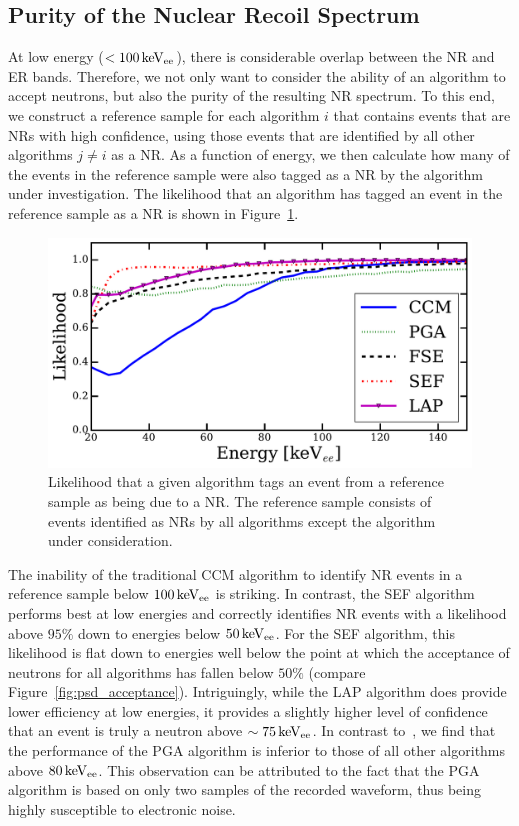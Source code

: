 \subsection{Purity of the Nuclear Recoil Spectrum}

At low energy ($<100\,\mathrm{keV_{ee}}$), there is considerable overlap between the NR and ER bands. Therefore, we not only want to consider the ability of an algorithm to accept neutrons, but also the purity of the resulting NR spectrum. To this end, we construct a reference sample for each algorithm $i$ that contains events that are NRs with high confidence, using those events that are identified by all other algorithms $j\neq i$ as a NR. As a function of energy, we then calculate how many of the events in the reference sample were also tagged as a NR by the algorithm under investigation. The likelihood that an algorithm has tagged an event in the reference sample as a NR is shown in Figure~\ref{fig:n-1_comparison}.

\begin{figure}[htb]
\centering
    \includegraphics[width = \textwidth]{figures/psd/fig_likelihood}
    \caption{Likelihood that a given algorithm tags an event from a reference sample as being due to a NR. The reference sample consists of events identified as NRs by all algorithms except the algorithm under consideration.}\label{fig:n-1_comparison}
\end{figure}

The inability of the traditional CCM algorithm to identify NR events in a reference sample below $100\,\mathrm{keV_{ee}}$ is striking. In contrast, the SEF algorithm performs best at low energies and correctly identifies NR events with a likelihood above $95\%$ down to energies below $50\,\mathrm{keV_{ee}}$. For the SEF algorithm, this likelihood is flat down to energies well below the point at which the acceptance of neutrons for all algorithms has fallen below $50\%$ (compare Figure~\ref{fig:psd_acceptance}). Intriguingly, while the LAP algorithm does provide lower efficiency at low energies, it provides a slightly higher level of confidence that an event is truly a neutron above $\sim75\,\mathrm{keV_{ee}}$. In contrast to~\cite{DMellow:2007}, we find that the performance of the PGA algorithm is inferior to those of all other algorithms above $80\,\mathrm{keV_{ee}}$. This observation can be attributed to the fact that the PGA algorithm is based on only two samples of the recorded waveform, thus being highly susceptible to electronic noise.

